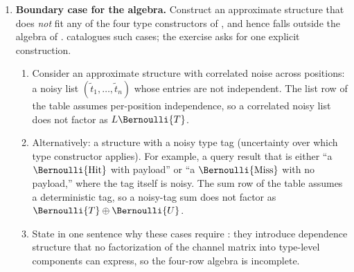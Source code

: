 \begin{enumerate}
\item \exstarstarstar
\label{ex:ch13-11}
\textbf{Boundary case for the algebra.}
Construct an approximate structure that does \emph{not} fit any of
the four type constructors of , and
hence falls outside the algebra of .
 catalogues such cases; the exercise asks
for one explicit construction.
\begin{enumerate}
  \item[(a)] Consider an approximate structure with correlated noise
    across positions: a noisy list $(\tilde t_1, \ldots, \tilde t_n)$
    whose entries are not independent. The list row of the
     table assumes per-position
    independence, so a correlated noisy list does not factor as
    $L \Bernoulli{T}$.
  \item[(b)] Alternatively: a structure with a noisy type tag
    (uncertainty over which type constructor applies). For example,
    a query result that is either ``a $\Bernoulli{\text{Hit}}$ with
    payload'' or ``a $\Bernoulli{\text{Miss}}$ with no payload,''
    where the tag itself is noisy. The sum row of the table assumes
    a deterministic tag, so a noisy-tag sum does not factor as
    $\Bernoulli{T} \oplus \Bernoulli{U}$.
  \item[(c)] State in one sentence why these cases require
    : they introduce dependence structure
    that no factorization of the channel matrix into type-level
    components can express, so the four-row algebra is incomplete.
\end{enumerate}

\end{enumerate}
